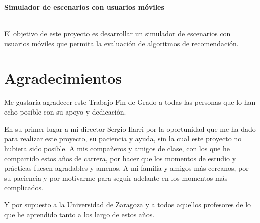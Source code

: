 \chapter*{}

\cleardoublepage
\thispagestyle{empty}

\begin{center}
{\large\bfseries Simulador de escenarios con usuarios móviles}\\
\end{center}


\vspace{0.7cm}
\\

El objetivo de este proyecto es desarrollar un simulador de escenarios con usuarios móviles que permita la evaluación de algoritmos de recomendación.
\cleardoublepage


\thispagestyle{empty}


\chapter*{Agradecimientos}
\thispagestyle{empty}

       \vspace{1cm}


Me gustaría agradecer este Trabajo Fin de Grado a todas las personas que lo han echo posible con su apoyo y dedicación.

\vspace{1cm}
En su primer lugar a mi director Sergio Ilarri por la oportunidad que me ha dado para realizar este proyecto, su paciencia y ayuda, sin la cual este proyecto no hubiera sido posible. A mis compañeros y amigos de clase, con los que he compartido estos años de carrera, por hacer que los momentos de estudio y prácticas fuesen agradables y amenos. A mi familia y amigos más cercanos, por su paciencia y por motivarme para seguir adelante en los momentos más complicados.

\vspace{1cm}
Y por supuesto a la Universidad de Zaragoza y a todos aquellos profesores de lo que he aprendido tanto a los largo de estos años.

\cleardoublepage

\tableofcontents %

\cleardoublepage
{} %
\listoffigures %

\cleardoublepage
{} %
\listoftables %
